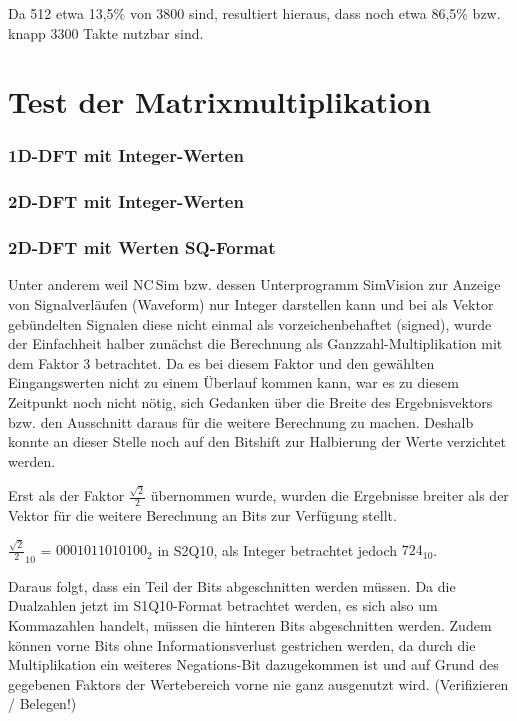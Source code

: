  Da 512 etwa 13,5$\%$ von 3800 sind, resultiert hieraus, dass noch etwa 86,5$\%$ bzw. knapp 3300 Takte nutzbar sind.

 
 
\section{Test der Matrixmultiplikation}


\subsubsection{1D-DFT mit Integer-Werten}
 
\subsubsection{2D-DFT mit Integer-Werten}

\subsubsection{2D-DFT mit Werten SQ-Format}

Unter anderem weil NC\,Sim bzw. dessen Unterprogramm SimVision zur Anzeige von Signalverläufen (Waveform) nur Integer darstellen kann und bei als Vektor gebündelten Signalen 
diese nicht einmal als vorzeichenbehaftet (signed), wurde der Einfachheit halber zunächst die Berechnung als Ganzzahl-Multiplikation mit dem Faktor 3 betrachtet. 
Da es bei diesem Faktor und den gewählten Eingangswerten nicht zu einem 
Überlauf kommen kann, war es zu diesem Zeitpunkt noch nicht nötig, sich Gedanken über die Breite des Ergebnisvektors bzw. den Ausschnitt daraus für die weitere
Berechnung zu machen. Deshalb konnte an dieser Stelle noch auf den Bitshift zur Halbierung der Werte verzichtet werden.

Erst als der Faktor $\frac{\sqrt{2}}{2}$ übernommen wurde, wurden die Ergebnisse breiter als der Vektor für die weitere Berechnung an Bits zur Verfügung stellt.

${\frac{\sqrt{2}}{2}}_{10}$ = $0001011010100_2$ in S2Q10, als Integer betrachtet jedoch $724_{10}$.

Daraus folgt, dass ein Teil der Bits abgeschnitten werden müssen. Da die Dualzahlen jetzt im S1Q10-Format betrachtet werden, es sich also um Kommazahlen handelt,
müssen die hinteren Bits abgeschnitten werden. Zudem können vorne Bits ohne Informationsverlust gestrichen werden, da durch die Multiplikation ein weiteres 
Negations-Bit dazugekommen ist und auf Grund des gegebenen Faktors der Wertebereich vorne nie ganz ausgenutzt wird. (Verifizieren / Belegen!)

 